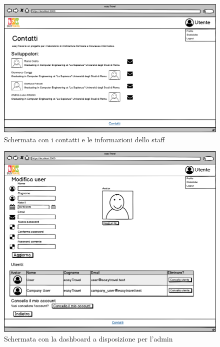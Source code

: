 \documentclass[11pt]{article}
\begin{document}
\begin{figure}[!ht]
	\includegraphics[width=1\textwidth]{./Mockup/Contatti-registrato} %
	\caption{Schermata con i contatti e le informazioni dello staff}
	\label{fig:contattireg}
\end{figure}

\begin{figure}[!ht]
	\includegraphics[width=1\textwidth]{./Mockup/Profilo-admin} %
	\caption{Schermata con la dashboard a disposizione per l'admin}
	\label{fig:profiloadmin}
\end{figure}
\end{document}
